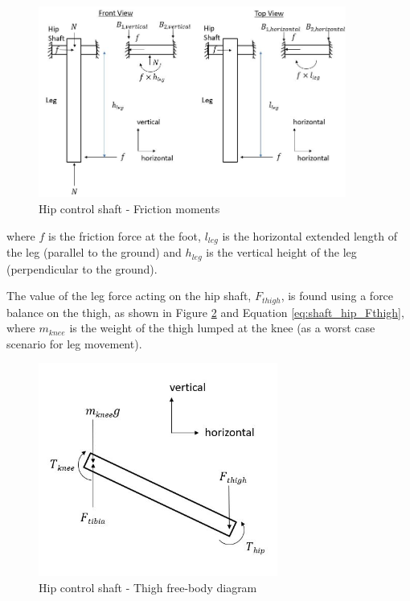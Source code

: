 \begin{figure}
    \centering
    \includegraphics[width=0.9\textwidth]{4_Analysis/img/Shafts/ShaftHipFriction.JPG}
    \caption{Hip control shaft - Friction moments}
    \label{fig:shaft_hip_friction}
\end{figure}

where $f$ is the friction force at the foot, $l_{leg}$ is the horizontal extended length of the leg (parallel to the ground) and $h_{leg}$ is the vertical height of the leg (perpendicular to the ground).

The value of the leg force acting on the hip shaft, $F_{thigh}$, is found using a force balance on the thigh, as shown in Figure \ref{fig:shaft_hip_thigh} and Equation \ref{eq:shaft_hip_Fthigh}, where $m_{knee}$ is the weight of the thigh lumped at the knee (as a worst case scenario for leg movement).

\begin{figure}
    \centering
    \includegraphics[width=0.7\textwidth]{4_Analysis/img/Shafts/ShaftHipThigh.JPG}
    \caption{Hip control shaft - Thigh free-body diagram}
    \label{fig:shaft_hip_thigh}
\end{figure}

